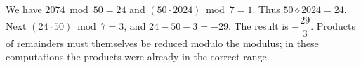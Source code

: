 We have $2074\bmod50=24$ and $(50\cdot2024)\bmod7=1$. Thus $50\diamond2024=24$. Next $(24\cdot50)\bmod7=3$, and $24-50-3=-29$. The result is $\boxed{-\dfrac{29}{3}}$. Products of remainders must themselves be reduced modulo the modulus; in these computations the products were already in the correct range.
